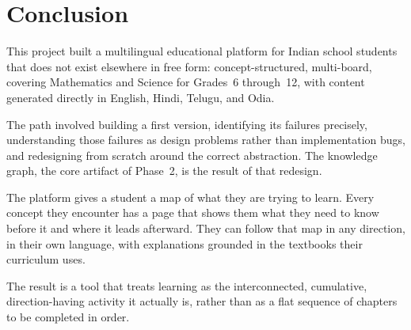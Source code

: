 \documentclass[12pt,a4paper]{article}
\begin{document}
\section{Conclusion}

This project built a multilingual educational platform for Indian school students
that does not exist elsewhere in free form: concept-structured, multi-board,
covering Mathematics and Science for Grades~6 through~12,
with content generated directly in English, Hindi, Telugu, and Odia.

The path involved building a first version, identifying its failures precisely,
understanding those failures as design problems rather than implementation bugs,
and redesigning from scratch around the correct abstraction.
The knowledge graph, the core artifact of Phase~2, is the result of that redesign.

The platform gives a student a map of what they are trying to learn.
Every concept they encounter has a page that shows them what they need to know before it
and where it leads afterward.
They can follow that map in any direction, in their own language,
with explanations grounded in the textbooks their curriculum uses.

The result is a tool that treats learning as the interconnected, cumulative, direction-having
activity it actually is, rather than as a flat sequence of chapters to be completed
in order.
\end{document}
